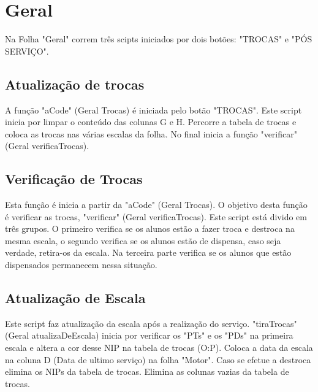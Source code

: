 \graphicspath{{Images/}}

\section{Geral}
Na Folha "Geral" correm três scipts iniciados por dois botões: "TROCAS" e "PÓS SERVIÇO".

\subsection{Atualização de trocas}
A função "aCode" (Geral Trocas) é iniciada pelo botão "TROCAS". Este script inicia por limpar o conteúdo das colunas G e H. Percorre a tabela de trocas e coloca as trocas nas várias escalas da folha. No final inicia a função "verificar" (Geral verificaTrocas).

\subsection{Verificação de Trocas}
Esta função é inicia a partir da "aCode" (Geral Trocas). O objetivo desta função é verificar as trocas,
"verificar" (Geral verificaTrocas). Este script está divido em três grupos. O primeiro verifica se os alunos estão a fazer troca e destroca na mesma escala, o segundo verifica se os alunos estão de dispensa, caso seja verdade, retira-os da escala. Na terceira parte verifica se os alunos que estão dispensados permanecem nessa situação.

\subsection{Atualização de Escala}
Este script faz atualização da escala após a realização do serviço. "tiraTrocas" (Geral atualizaDeEscala) inicia por verificar os "PTs" e os "PDs" na primeira escala e altera a cor desse NIP na tabela de trocas (O:P). Coloca a data da escala na coluna D (Data de ultimo serviço) na folha "Motor". Caso se efetue a destroca elimina os NIPs da tabela de trocas. Elimina as colunas vazias da tabela de trocas.